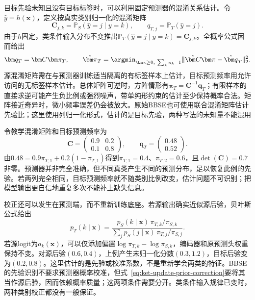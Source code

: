 目标先验未知且没有目标标签时，可以利用固定预测器的混淆关系估计。令$\hat y=h(\bm{x})$，定义按真实类别归一化的混淆矩阵
\[
\bm C_{j,k}=\mathbb P_S(\hat y=j\mid y=k),
\qquad q_{T,j}=\mathbb P_T(\hat y=j).
\]
由于$h$固定，类条件输入分布不变推出$\mathbb P_T(\hat y=j\mid y=k)=\bm C_{j,k}$。全概率公式因而给出
\begin{equation}
\bm q_T=\bm C\bm\pi_T,
\qquad
\hat{\bm\pi}_T
=\argmin_{\bm\pi\ge0,\ \sum_k\pi_k=1}
\lVert\hat{\bm C}\bm\pi-\hat{\bm q}_T\rVert_2^2.
\label{eq:ket-update-bbse}
\end{equation}
源混淆矩阵需在与预测器训练适当隔离的有标签样本上估计，目标预测频率用允许访问的无标签样本估计。总体矩阵可逆时，方阵情形有$\bm\pi_T=\bm C^{-1}\bm q_T$；有限样本的直接求逆可能产生负比例或强烈噪声，带单纯形约束的估计至少保持概率合法。矩阵接近奇异时，微小频率误差仍会被放大。原始BBSE也可使用联合混淆矩阵估计先验比；这里使用列归一化形式，估计的是目标先验，两种写法的未知量不能混用

令教学混淆矩阵和目标预测频率为
\[
\bm C=
\begin{pmatrix}0.9&0.2\\0.1&0.8\end{pmatrix},
\qquad
\bm q_T=
\begin{pmatrix}0.48\\0.52\end{pmatrix}.
\]
由$0.48=0.9\pi_{T,1}+0.2(1-\pi_{T,1})$得到$\pi_{T,1}=0.4$、$\pi_{T,2}=0.6$，且$\det(\bm C)=0.7$非零。预测器并非完全准确，但不同真类产生不同的预测分布，足以恢复此例的先验。若两列完全相同，目标预测频率就不随类别比例改变，估计问题不可识别；把模型输出更自信地重复多次不能补上缺失信息。

校正还可以发生在预测端，而不重新训练底座。若源输出确实近似源后验，贝叶斯公式给出
\begin{equation}
p_T(k\mid\bm{x})
=\frac{p_S(k\mid\bm{x})\,\pi_{T,k}/\pi_{S,k}}
       {\sum_j p_S(j\mid\bm{x})\,\pi_{T,j}/\pi_{S,j}}.
\label{eq:ket-update-prior-correction}
\end{equation}
若源logit为$a_k(\bm{x})$，可以仅添加偏置$\log\pi_{T,k}-\log\pi_{S,k}$，编码器和原预测头权重保持不变。对源后验$(0.6,0.4)$，上例产生未归一化分数$(0.3,1.2)$，目标后验变为$(0.2,0.8)$。这里估计的是先验或校准系数，不是重新学会两类的特征。BBSE的先验识别不要求预测器概率校准，但式~\eqref{eq:ket-update-prior-correction}要将其当作源后验，因而依赖概率质量；这两项条件需要分开。类条件输入规律已变时，两种类别校正都没有一般保证。

